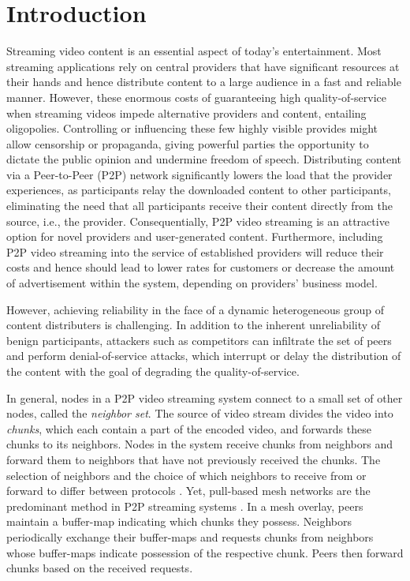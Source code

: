\section{Introduction}
\label{sec:intro}

Streaming video content is an essential aspect of today's entertainment. Most streaming applications rely on central providers that have significant resources at their hands and hence distribute content to a large audience in a fast and reliable manner. 
However, these enormous costs of guaranteeing high quality-of-service when streaming videos impede alternative providers and content, entailing oligopolies. Controlling or influencing these few highly visible provides might allow censorship or propaganda, giving powerful parties the opportunity  to dictate the public opinion and undermine freedom of speech.   
Distributing content via a Peer-to-Peer (P2P) network significantly lowers the load that the provider experiences, as participants relay the downloaded content to other participants, eliminating the need that all participants receive their content directly from the source, i.e., the provider. 
Consequentially, P2P video streaming is an attractive option for novel providers and user-generated content. Furthermore, including 
P2P video streaming into the service of established providers will reduce their costs and hence should lead to lower rates for customers or decrease the amount of advertisement within the system, depending on providers' business model. 


However, achieving reliability in the face of a dynamic heterogeneous group of content distributers is challenging. In addition to the inherent unreliability of benign participants, attackers such as competitors can infiltrate the set of peers and perform denial-of-service attacks, which interrupt or delay the distribution of the content with the goal of degrading the quality-of-service. 

In general, nodes in a P2P video streaming system connect to a small set of other nodes, called the \emph{neighbor set}. 
The source of video stream divides the video into \emph{chunks}, which each contain a part of the encoded video, and forwards these chunks to its neighbors. Nodes in the system receive chunks from neighbors and forward them to neighbors that have not previously received the chunks. 
The selection of neighbors and the choice of which neighbors to receive from or forward to differ between protocols \cite{sasi2014survey}.  Yet, pull-based mesh networks are the predominant method in P2P streaming systems \cite{zhang2014modeling}. In a mesh overlay, peers maintain a buffer-map indicating which chunks they possess.  Neighbors periodically exchange their buffer-maps and requests chunks from neighbors whose buffer-maps indicate possession of the respective chunk. Peers then forward chunks based on the received requests. 


